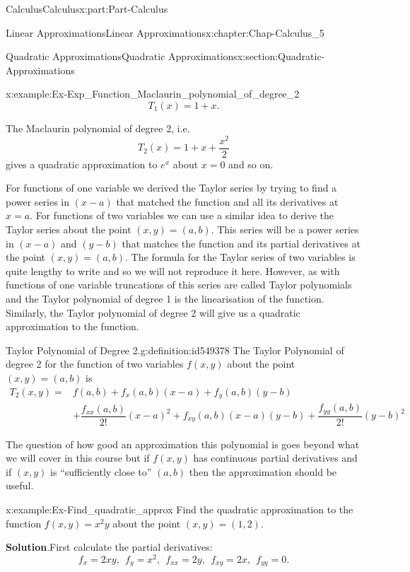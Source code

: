 \documentclass[oneside,10pt,]{book}
\newcommand{\blocktitlefont}{\relax}
\numberwithin{equation}{section}
\newcommand{\amp}{&}
\begin{document}
\begin{partptx}{Calculus}{}{Calculus}{}{}{x:part:Part-Calculus}
\begin{chapterptx}{Linear Approximations}{}{Linear Approximations}{}{}{x:chapter:Chap-Calculus_5}
\begin{sectionptx}{Quadratic Approximations}{}{Quadratic Approximations}{}{}{x:section:Quadratic-Approximations}
\begin{example}{}{x:example:Ex-Exp_Function_Maclaurin_polynomial_of_degree_2}
\begin{equation*}
T_1 (x) = 1+x\text{.}
\end{equation*}
%
\par
The Maclaurin polynomial of degree 2, i.e.%
\begin{equation*}
T_2 (x) = 1 + x + \dfrac{x^2}{2}
\end{equation*}
gives a quadratic approximation to \(e^x\) about \(x=0\) and so on.%
\end{example}
For functions of one variable we derived the Taylor series by trying to find a power series in \((x-a)\) that matched the function and all its derivatives at \(x=a\). For functions of two variables we can use a similar idea to derive the Taylor series about the point \((x,y)=(a,b)\). This series will be a power series in \((x-a)\) and \((y-b)\) that matches the function and its partial derivatives at the point \((x,y)=(a,b)\). The formula for the Taylor series of two variables is quite lengthy to write and so we will not reproduce it here. However, as with functions of one variable truncations of this series are called Taylor polynomials and the Taylor polynomial of degree 1 is the linearisation of the function. Similarly, the Taylor polynomial of degree 2 will give us a quadratic approximation to the function.%
\begin{definition}{Taylor Polynomial of Degree 2.}{g:definition:id549378}%
The Taylor Polynomial of degree 2 for the function of two variables \(f(x,y)\) about the point \((x,y) = (a,b)\) is%
\begin{align*}
T_2(x,y) = \amp f(a,b) + f_x(a,b)(x-a) + f_y(a,b)(y-b)\\
\amp + \dfrac{f_{xx}(a,b)}{2!} (x-a)^2 + f_{xy}(a,b)(x-a)(y-b) + \dfrac{f_{yy}(a,b)}{2!}(y-b)^2
\end{align*}
\end{definition}
The question of how good an approximation this polynomial is goes beyond what we will cover in this course but if \(f(x,y)\) has continuous partial derivatives and if \((x,y)\) is ``sufficiently close to'' \((a,b)\) then the approximation should be useful.%
\begin{example}{}{x:example:Ex-Find_quadratic_approx}%
Find the quadratic approximation to the function \(f(x,y) = x^2y\) about the point \((x,y) = (1,2)\).%
\par\smallskip%
\noindent\textbf{\blocktitlefont Solution}.\hypertarget{g:solution:id549417}{}\quad{}First calculate the partial derivatives:%
\begin{equation*}
f_x = 2xy, \: \: f_y = x^2, \: \: f_{xx} = 2y, \: \: f_{xy} = 2x, \: \: f_{yy} = 0.

\end{equation*}
\end{example}
\end{sectionptx}
\end{chapterptx}
\end{partptx}
\end{document}
